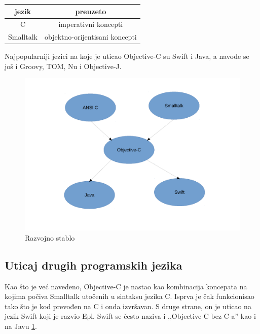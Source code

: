 \documentclass[a4paper]{article}
\begin{document}
{\begin{table}[h!]
\begin{center}
\begin{tabular}{|c|c|} \hline
jezik &preuzeto \\ \hline
C &imperativni koncepti \\ \hline
Smalltalk &objektno-orijentisani koncepti \\ \hline
\end{tabular}
\label{tab:tabela1}
\end{center}
\end{table}

Najpopularniji jezici na koje je uticao Objective-C su Swift i Java, a navode se još i Groovy, TOM, Nu i Objective-J.

\begin{figure}[h!]
	\begin{center}
	\includegraphics[scale=0.4]{razvojno_stablo.pdf}
	\caption{Razvojno stablo}	
	\label{fig:Razvojno_stablo}
	\end{center}
\end{figure}

\subsection{Uticaj drugih programskih jezika}
\label{subsec:uticaj}
Kao što je već navedeno, Objective-C je nastao kao kombinacija koncepata na kojima počiva Smalltalk utočenih u sintaksu jezika C. Isprva je čak funkcionisao tako što je kod prevođen na C i onda izvršavan. S druge strane, on je uticao na jezik Swift koji je razvio Epl. Swift \cite{swift} se često naziva i ,,Objective-C bez C-a'' kao i na Javu \ref{fig:Razvojno_stablo}. 

}
\end{document}
